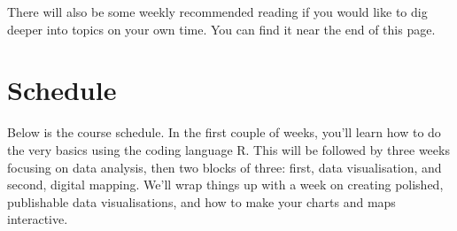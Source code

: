 \documentclass[
  letterpaper,
  DIV=11,
  numbers=noendperiod]{scrreprt}
\begin{document}
There will also be some weekly recommended reading if you would like to
dig deeper into topics on your own time. You can find it near the end of
this page.

\section*{Schedule}\label{schedule}


Below is the course schedule. In the first couple of weeks, you'll learn
how to do the very basics using the coding language R. This will be
followed by three weeks focusing on data analysis, then two blocks of
three: first, data visualisation, and second, digital mapping. We'll
wrap things up with a week on creating polished, publishable data
visualisations, and how to make your charts and maps interactive.
\end{document}
